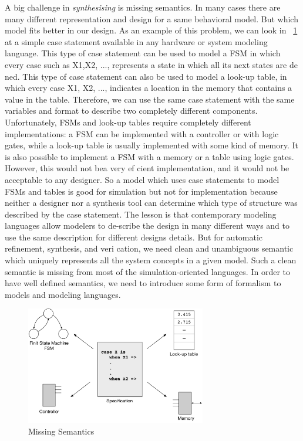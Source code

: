 A big challenge in \emph{synthesising} is missing semantics. In many cases there are many different representation and design for a same behavioral model. But which model fits better in our design. 
As an example of this problem, we can look in ~\ref{fig:missing_semantics} at a simple case statement available in any hardware or system modeling language.
This type of case statement can be used to model a FSM in which every case such as X1,X2, ..., represents a state in which all its next states are de ned.
This type of case statement can also be used to model a look-up table, in which every case X1, X2, ..., indicates a location in the memory that contains a value in the table.
Therefore,  we can use the same case statement with the same variables and format to describe two completely different components.
Unfortunately, FSMs and look-up tables require completely different implementations:  a FSM can be implemented with a controller or with logic gates, while a look-up table is usually implemented with some kind of memory.
It is also possible to implement a FSM with a memory or a table using logic gates.
However, this would not bea very ef cient implementation, and it would not be acceptable to any designer.
So a model which uses case statements to model FSMs and tables is good for simulation but not for implementation because neither a designer nor a synthesis tool can determine which type of structure was described by the case statement.
The lesson is that contemporary modeling languages allow modelers to de-scribe the design in many different ways and to use the same description for different designs details. But for automatic refinement, synthesis, and veri cation, we need clean and unambiguous semantic which uniquely represents all the system concepts in a given model.  Such a clean semantic is missing from most of the simulation-oriented  languages.
In order to have well defined semantics, we need to introduce some form of formalism to models and modeling languages.


\begin{figure}[h]
    \centering
    \includegraphics[width=0.7\textwidth]{figures/Introduction/Missing_Semantics.pdf}
    \caption{Missing Semantics}
    \label{fig:missing_semantics}
\end{figure}


